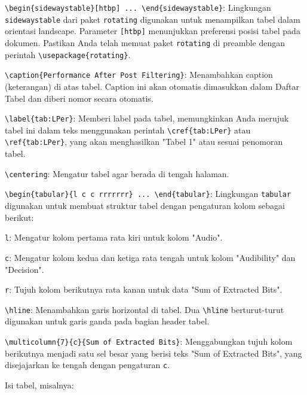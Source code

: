 \begin{packed_enum}
    \item \texttt{\textbackslash begin\{sidewaystable\}[htbp] ... \textbackslash end\{sidewaystable\}}: Lingkungan \texttt{sidewaystable} dari paket \texttt{rotating} digunakan untuk menampilkan tabel dalam orientasi landscape. Parameter \texttt{[htbp]} menunjukkan preferensi posisi tabel pada dokumen. Pastikan Anda telah memuat paket \texttt{rotating} di preamble dengan perintah \texttt{\textbackslash usepackage\{rotating\}}.
    \item \texttt{\textbackslash caption\{Performance After Post Filtering\}}: Menambahkan caption (keterangan) di atas tabel. Caption ini akan otomatis dimasukkan dalam Daftar Tabel dan diberi nomor secara otomatis.
    \item \texttt{\textbackslash label\{tab:LPer\}}: Memberi label pada tabel, memungkinkan Anda merujuk tabel ini dalam teks menggunakan perintah \texttt{\textbackslash cref\{tab:LPer\}} atau \texttt{\textbackslash ref\{tab:LPer\}}, yang akan menghasilkan "Tabel 1" atau sesuai penomoran tabel.
    \item \texttt{\textbackslash centering}: Mengatur tabel agar berada di tengah halaman.
    \item \texttt{\textbackslash begin\{tabular\}\{l c c rrrrrrr\} ... \textbackslash end\{tabular\}}: Lingkungan \texttt{tabular} digunakan untuk membuat struktur tabel dengan pengaturan kolom sebagai berikut:
        \begin{packed_enum}
            \item \texttt{l}: Mengatur kolom pertama rata kiri untuk kolom "Audio".
            \item \texttt{c}: Mengatur kolom kedua dan ketiga rata tengah untuk kolom "Audibility" dan "Decision".
            \item \texttt{r}: Tujuh kolom berikutnya rata kanan untuk data "Sum of Extracted Bits".
        \end{packed_enum}
    \item \texttt{\textbackslash hline}: Menambahkan garis horizontal di tabel. Dua \texttt{\textbackslash hline} berturut-turut digunakan untuk garis ganda pada bagian header tabel.
    \item \texttt{\textbackslash multicolumn\{7\}\{c\}\{Sum of Extracted Bits\}}: Menggabungkan tujuh kolom berikutnya menjadi satu sel besar yang berisi teks "Sum of Extracted Bits", yang disejajarkan ke tengah dengan pengaturan \texttt{c}.
    \item Isi tabel, misalnya:

\end{packed_enum}
